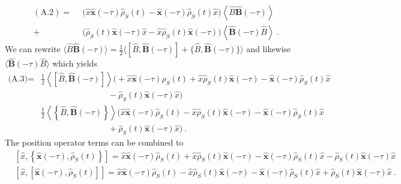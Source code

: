 	\begin{equation}
		\begin{split}
			(\text{A}.2) =	~~  &\Big (\hat{x} \boldsymbol{\hat{x}}(-\tau) \hat{\rho}_S(t) - \boldsymbol{\hat{x}}(-\tau) \hat{\rho}_S(t) \hat{x}   \Big) \left \langle \hat{B} \boldsymbol{\hat{B}}(-\tau) \right \rangle \\
			+& \Big (  \hat{\rho}_S(t) \boldsymbol{\hat{x}}(-\tau) \hat{x}  - \hat{x} \hat{\rho}_S(t) \boldsymbol{\hat{x}}(-\tau)    \Big) \left \langle \boldsymbol{\hat{B}}(-\tau) \hat{B}  \right \rangle ~.
		\end{split}
	\end{equation}
	We can rewrite $\langle \hat{B} \boldsymbol{\hat{B}}(-\tau) \rangle = \frac{1}{2}	\langle [\hat{B}, \boldsymbol{\hat{B}}(-\tau)] + \{ \hat{B},  \boldsymbol{\hat{B}}(-\tau)\} \rangle$ and likewise $ \langle \boldsymbol{\hat{B}}(-\tau) \hat{B}  \rangle$ which yields
	\begin{equation} \label{Eq::Expanded-Bath-Operators}
		\begin{split}
			\text{(A.3)} =	&\frac{1}{2} \left\langle \left[\hat{B}, \boldsymbol{\hat{B}}(-\tau) \right]  \right \rangle \Big ( +\hat{x} \boldsymbol{\hat{x}}(-\tau) \hat{\rho}_S(t) + \hat{x} \hat{\rho}_S(t) \boldsymbol{\hat{x}}(-\tau) - \boldsymbol{\hat{x}}(-\tau) \hat{\rho}_S(t) \hat{x}  \\
			& \qquad \qquad \qquad \qquad -  \hat{\rho}_S(t) \boldsymbol{\hat{x}}(-\tau) \hat{x} \Big ) \\
			& \frac{1}{2} \left\langle \left \{\hat{B}, \boldsymbol{\hat{B}}(-\tau)\right \}  \right \rangle \Big ( \hat{x} \boldsymbol{\hat{x}}(-\tau) \hat{\rho}_S(t) - \hat{x} \hat{\rho}_S(t) \boldsymbol{\hat{x}}(-\tau) - \boldsymbol{\hat{x}}(-\tau) \hat{\rho}_S(t) \hat{x} \\
			& \qquad \qquad \qquad \qquad + \hat{\rho}_S(t) \boldsymbol{\hat{x}}(-\tau) \hat{x} \Big) ~.
		\end{split}
	\end{equation}
	The position operator terms can be combined to
	\begin{align} \label{Eq::recombined-pos-operators}
		&\left[\hat{x}, \left\{\boldsymbol{\hat{x}}(-\tau),  \hat{\rho}_S(t)\right\}\right] =	\hat{x} \boldsymbol{\hat{x}}(-\tau) \hat{\rho}_S(t) + \hat{x} \hat{\rho}_S(t) \boldsymbol{\hat{x}}(-\tau) - \boldsymbol{\hat{x}}(-\tau) \hat{\rho}_S(t) \hat{x}
		-  \hat{\rho}_S(t) \boldsymbol{\hat{x}}(-\tau) \hat{x} \\
		&\left[\hat{x}, \left[\boldsymbol{\hat{x}}(-\tau),  \hat{\rho}_S(t)\right] \right] =	\hat{x} \boldsymbol{\hat{x}}(-\tau) \hat{\rho}_S(t) - \hat{x} \hat{\rho}_S(t) \boldsymbol{\hat{x}}(-\tau) - \boldsymbol{\hat{x}}(-\tau) \hat{\rho}_S(t) \hat{x}
		+  \hat{\rho}_S(t) \boldsymbol{\hat{x}}(-\tau) \hat{x}~.
	\end{align}
